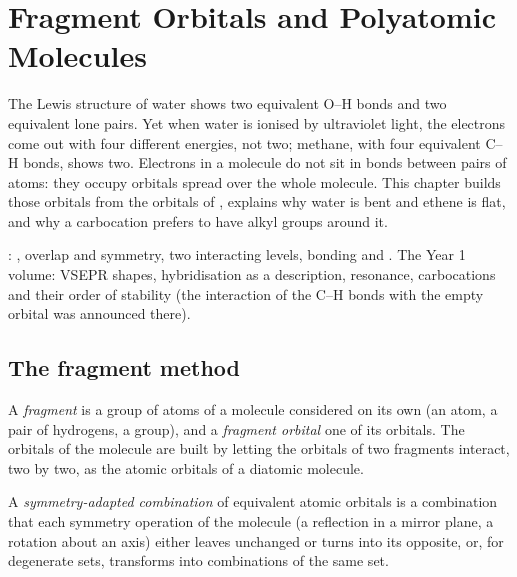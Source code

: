 \chapter{Fragment Orbitals and Polyatomic Molecules}\label{ch:b2:fragment-orbitals}

The Lewis structure of water shows two equivalent O--H bonds and two
equivalent lone pairs. Yet when water is ionised by ultraviolet light, the
electrons come out with four different energies, not two; methane, with four
equivalent C--H bonds, shows two. Electrons in a molecule do not sit in bonds
between pairs of atoms: they occupy orbitals spread over the whole molecule.
This chapter builds those orbitals from the orbitals of , explains
why water is bent and ethene is flat, and why a carbocation prefers to have
alkyl groups around it.

\begin{recall}
: , overlap and symmetry, two interacting levels,
bonding and . The Year 1 volume: VSEPR shapes, hybridisation
as a description, resonance, carbocations and their order of stability (the
interaction of the C--H bonds with the empty orbital was announced there).
\end{recall}

\section{The fragment method}

\begin{definition}[Fragments]\label{def:b2:fragment-orbitals:fragment}
A \emph{fragment} is a group of atoms of a molecule considered on
its own (an atom, a pair of hydrogens, a  group), and a \emph{fragment
orbital} one of its orbitals. The orbitals of the
molecule are built by letting the orbitals of two fragments interact, two by
two, as the atomic orbitals of a diatomic molecule.
\end{definition}

\begin{definition}\label{def:b2:fragment-orbitals:symmetry-adapted}
A \emph{symmetry-adapted combination} of
equivalent atomic orbitals is a combination that each symmetry operation of the
molecule (a reflection in a mirror plane, a rotation about an axis) either
leaves unchanged or turns into its opposite, or, for degenerate sets, transforms
into combinations of the same set.
\end{definition}

